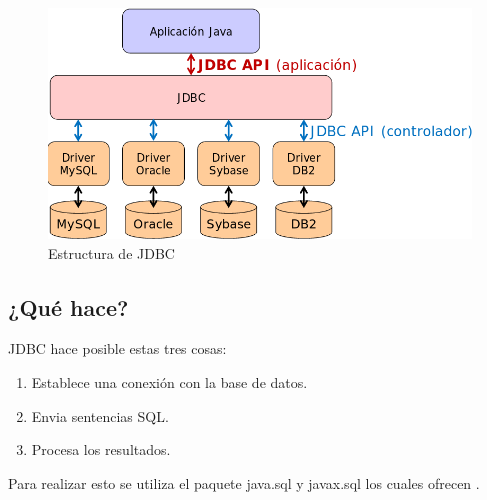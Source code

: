 \documentclass[a4paper,12pt]{article}
\begin{document}
\begin{figure}[H]
\begin{center}
 \includegraphics[width=12cm]{estructura.png}
 \caption{Estructura de JDBC}
 \label{fig:estructura}
\end{center}
\end{figure}



\subsection{¿Qué hace?}
JDBC hace posible estas tres cosas:
\begin{enumerate}
 \item Establece una conexión con la base de datos.
 \item Envia sentencias SQL.
 \item Procesa los resultados.
\end{enumerate}

Para realizar esto se utiliza el paquete java.sql y javax.sql los cuales ofrecen \cite{PDF}.
\end{document}
